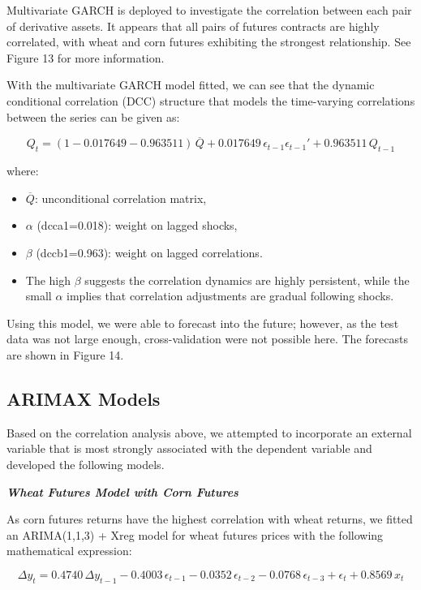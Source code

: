 \documentclass[11pt]{article}
\begin{document}
Multivariate GARCH is deployed to investigate the correlation between each pair of derivative assets. It appears that all pairs of futures contracts are highly correlated, with wheat and corn futures exhibiting the strongest relationship. See Figure 13 for more information.

With the multivariate GARCH model fitted, we can see that the dynamic conditional correlation (DCC) structure that models the time-varying correlations between the series can be given as:

\begin{equation}
Q_{t} = (1 - 0.017649 - 0.963511)\,\overline{Q} + 0.017649\,\epsilon_{t-1}\epsilon_{t-1}' + 0.963511\,Q_{t-1}
\end{equation}

where:

\begin{itemize}
\item $\overline{Q}$: unconditional correlation matrix,
\item $\alpha$ (dcca1=0.018): weight on lagged shocks,
\item $\beta$ (dccb1=0.963): weight on lagged correlations.
\item The high $\beta$ suggests the correlation dynamics are highly persistent, while the small $\alpha$ implies that correlation adjustments are gradual following shocks.
\end{itemize}

Using this model, we were able to forecast into the future; however, as the test data was not large enough, cross-validation were not possible here. The forecasts are shown in Figure 14.

\subsection{ARIMAX Models}

Based on the correlation analysis above, we attempted to incorporate an external variable that is most strongly associated with the dependent variable and developed the following models.

\textbf{\emph{Wheat Futures Model with Corn Futures}}

As corn futures returns have the highest correlation with wheat returns, we fitted an ARIMA(1,1,3) + Xreg model for wheat futures prices with the following mathematical expression:

\begin{equation}
\Delta y_{t} = 0.4740\,\Delta y_{t-1} - 0.4003\,\epsilon_{t-1} - 0.0352\,\epsilon_{t-2} - 0.0768\,\epsilon_{t-3} + \epsilon_{t} + 0.8569\,x_{t}
\end{equation}
\end{document}
